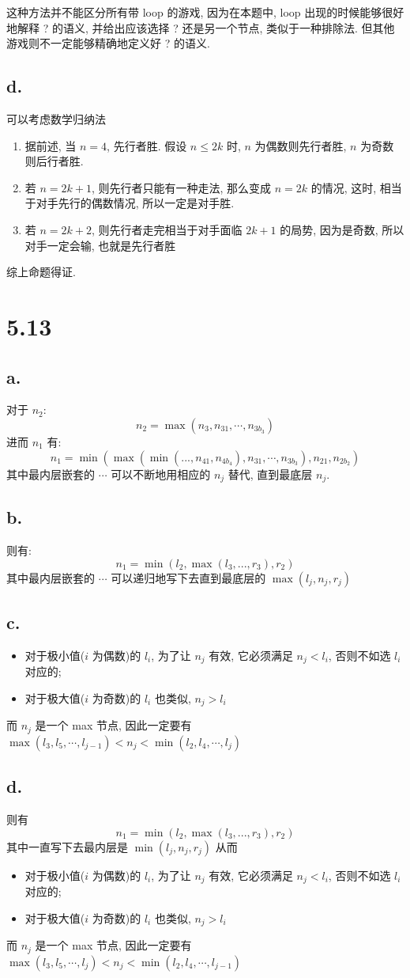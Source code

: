 \documentclass[UTF8]{article}
\begin{document}
这种方法并不能区分所有带 loop 的游戏, 因为在本题中, loop 出现的时候能够很好地解释 ? 的语义, 并给出应该选择 ? 还是另一个节点, 类似于一种排除法. 但其他游戏则不一定能够精确地定义好 ? 的语义.
\subsection*{d.}
可以考虑数学归纳法
\begin{enumerate}
	\item 据前述, 当 $n = 4$, 先行者胜. 假设 $n \le 2k$ 时, $n$ 为偶数则先行者胜, $n$ 为奇数则后行者胜.
	\item 若 $n = 2k+1$, 则先行者只能有一种走法, 那么变成 $n=2k$ 的情况, 这时, 相当于对手先行的偶数情况, 所以一定是对手胜.
	\item 若 $n=2k+2$, 则先行者走完相当于对手面临 $2k+1$ 的局势, 因为是奇数, 所以对手一定会输, 也就是先行者胜
\end{enumerate}
综上命题得证.

\section*{5.13}
\subsection*{a.}
对于 $n_2$:
$$n_2=\max(n_3,n_{31},\cdots,n_{3b_3})$$
进而 $n_1$ 有:
$$n_1=\min(\max(\min(..., n_{41},n_{4b_4}),n_{31},\cdots,n_{3b_3}), n_{21}, n_{2b_2})$$
其中最内层嵌套的 $\cdots$ 可以不断地用相应的 $n_j$ 替代, 直到最底层 $n_j$.
\subsection*{b.}
则有:
$$n_1=\min(l_2, \max(l_3,...,r_3), r_2)$$
其中最内层嵌套的 $\cdots$ 可以递归地写下去直到最底层的 $\max(l_j,n_j,r_j)$
\subsection*{c.}
\begin{itemize}
	\item 对于极小值($i$ 为偶数)的 $l_i$, 为了让 $n_j$ 有效, 它必须满足 $n_j< l_i$, 否则不如选 $l_i$ 对应的;
	\item 对于极大值($i$ 为奇数)的 $l_i$ 也类似, $n_j>l_i$
\end{itemize}
而 $n_j$ 是一个 max 节点, 因此一定要有 $\max(l_3,l_5,\cdots, l_{j-1})<n_j<\min(l_2,l_4,\cdots, l_{j})$
\subsection*{d.}
则有 $$n_1=\min(l_2, \max(l_3,...,r_3), r_2)$$
其中一直写下去最内层是 $\min(l_j,n_j,r_j)$
从而
\begin{itemize}
	\item 对于极小值($i$ 为偶数)的 $l_i$, 为了让 $n_j$ 有效, 它必须满足 $n_j< l_i$, 否则不如选 $l_i$ 对应的;
	\item 对于极大值($i$ 为奇数)的 $l_i$ 也类似, $n_j>l_i$
\end{itemize}
而 $n_j$ 是一个 max 节点, 因此一定要有 $\max(l_3,l_5,\cdots, l_{j})<n_j<\min(l_2,l_4,\cdots, l_{j-1})$
\end{document}
